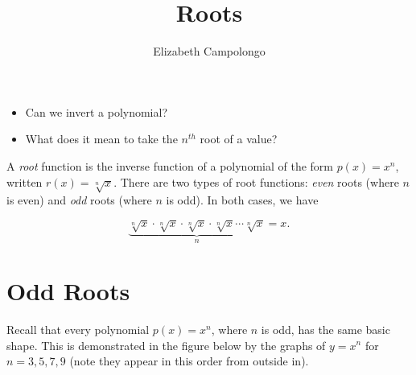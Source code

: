\documentclass{ximera}
\author{Elizabeth Campolongo}
\title{Roots}
\begin{document}
\begin{abstract}
  
\end{abstract}
\maketitle

\begin{motivatingQuestions}\begin{itemize}
\item Can we invert a polynomial?
\item What does it mean to take the $n^{th}$ root of a value?
\end{itemize}\end{motivatingQuestions}




A {\em root} function is the inverse function of a polynomial of the form $p(x)=x^n$, written $r(x)=\sqrt[n]{x}$. There are two types of root functions: {\em even} roots (where $n$ is even) and {\em odd} roots (where $n$ is odd). In both cases, we have

$$\underbrace{\sqrt[n]{x} \cdot \sqrt[n]{x} \cdot \sqrt[n]{x} \cdot \sqrt[n]{x} \cdots \sqrt[n]{x}}_n =x.$$

\section{Odd Roots}

Recall that every polynomial $p(x) = x^n$, where $n$ is odd, has the same basic shape. This is demonstrated in the figure below by the graphs of $y = x^n$ for $n = 3, 5,7,9$ (note they appear in this order from outside in).
\end{document}
